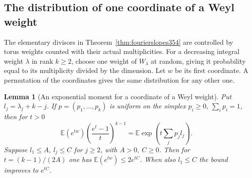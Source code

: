 \documentclass[a4paper,11pt]{article}
\newtheorem{lemma}[proposition]{Lemma}
\theoremstyle{definition}
\theoremstyle{remark}
\numberwithin{equation}{section}
\begin{document}
\subsection{The distribution of one coordinate of a Weyl weight}
\label{sec:oneweight355}

The elementary divisors in Theorem~\ref{thm:fourierslopes354}
are controlled by torus weights counted with their actual
multiplicities. For a decreasing integral weight \(\lambda\)
in rank \(k\ge2\), choose one weight of \(W_\lambda\) at random,
giving it probability equal to its multiplicity divided by the
dimension. Let \(w\) be its first coordinate. A permutation of
the coordinates gives the same distribution for any other one.

\begin{lemma}[An exponential moment for a coordinate of a Weyl weight]\leavevmode
\label{lem:oneweight355}
Put \(l_j=\lambda_j+k-j\). If \(p=(p_1,\ldots,p_k)\) is
uniform on the simplex \(p_i\ge0,\ \sum_i p_i=1\), then
for \(t>0\)
\[
  \mathbb E(e^{tw})
       \left(\frac{e^t-1}{t}\right)^{k-1}
       =\mathbb E\exp\!\left(t\sum_j p_j l_j\right).
\]
Suppose \(l_1\le A\), \(l_j\le C\) for \(j\ge2\), with
\(A>0,\ C\ge0\). Then for \(t=(k-1)/(2A)\) one has
\(\mathbb E(e^{tw})\le2e^{tC}\). When also \(l_1\le C\)
the bound improves to \(e^{tC}\).
\end{lemma}
\end{document}
